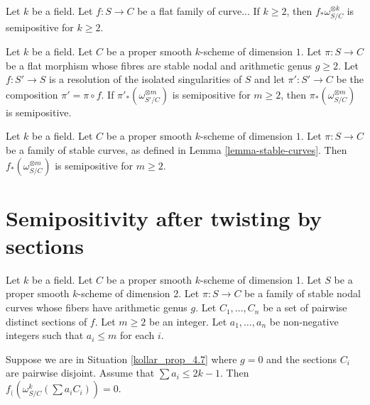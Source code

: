 \begin{lemma}
Let $k$ be a field.
Let $f : S \to C$ be a flat family of curve...
If $k \geq 2$, then $f_*\omega_{S/C}^{\otimes k}$ is semipositive for $k \geq 2$.
\end{lemma}

\begin{lemma}
\label{lemma-stable-curves-semipositive-resolve}
Let $k$ be a field.
Let $C$ be a proper smooth $k$-scheme of dimension $1$.
Let $\pi : S \to C$ be a flat morphism whose fibres are stable nodal and arithmetic
genus $g \geq 2$.
Let $f : S' \to S$ is a resolution of the isolated singularities of $S$
and let $\pi' : S' \to C$ be the composition $\pi' = \pi \circ f$.
If $\pi'_*(\omega_{S'/C}^{\otimes m})$ is semipositive for $m \geq 2$, then
$\pi_*(\omega_{S/C}^{\otimes m})$ is semipositive.
\end{lemma}

\begin{lemma}
\label{lemma-stable-curves-semipositive}
Let $k$ be a field.
Let $C$ be a proper smooth $k$-scheme of dimension $1$.
Let $\pi : S \to C$ be a family of stable curves,
as defined in Lemma \ref{lemma-stable-curves}.
Then $f_*(\omega_{S/C}^{\otimes m})$ is semipositive for $m \geq 2$.
\end{lemma}








\section{Semipositivity after twisting by sections}

\begin{situation}\label{kollar_prop_4.7}
Let $k$ be a field.
Let $C$ be a proper smooth $k$-scheme of dimension 1.
Let $S$ be a proper smooth $k$-scheme of dimension 2.
Let $\pi:S\to C$ be a family of stable nodal curves whose fibers have arithmetic genus $g$.
Let $C_1,\ldots,C_n$ be a set of pairwise distinct sections of $f$.
Let $m\ge2$ be an integer.
Let $a_1,\ldots,a_n$ be non-negative integers such that $a_i\le m$ for each $i$.
\end{situation}

\begin{lemma}
Suppose we are in Situation \ref{kollar_prop_4.7} where $g=0$ and the sections $C_i$ are pairwise disjoint.
Assume that $\sum a_i\le 2k-1$.
Then $f_{(}(\omega_{S/C}^{k}(\sum a_iC_i))=0$. 
\end{lemma}


